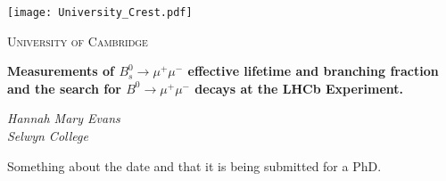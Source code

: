 \begin{titlepage}
  \centering
  \texttt{[image: University\_Crest.pdf]}\par\vspace{1cm}
  {\scshape\LARGE  University of Cambridge \par}
  \vspace{1cm}
  \vspace{1.5cm}
  {\LARGE\bfseries Measurements of $B_{s}^{0} \to \mu^{+} \mu^{-}$ effective lifetime and branching fraction and the search for $B^{0} \to \mu^{+} \mu^{-}$ decays at the LHCb Experiment.\par}
  \vspace{2cm}
  {\Large\itshape Hannah Mary Evans\\
    Selwyn College\par}
  \vfill
  {\large
  }
  \vfill

  {\large Something about the date and that it is being submitted for a PhD.}
\end{titlepage}
